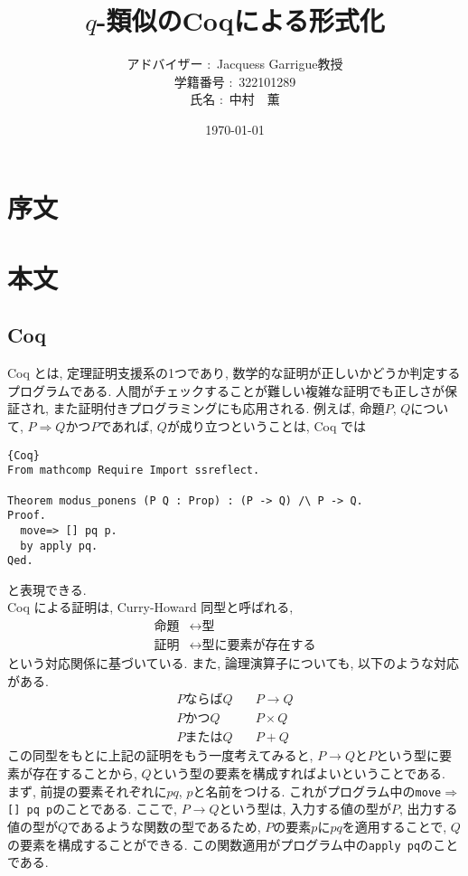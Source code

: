 \documentclass[11pt]{jarticle}
\theoremstyle{mystyle}
\newcommand{\Lra}{\Longrightarrow}
\newcommand{\ra}{\rightarrow}
\newcommand{\0}{\textbf{0}}
\newcommand{\1}{\textbf{1}}
\newcommand{\2}{\textbf{2}}
\begin{document}
\title{$q$-類似のCoqによる形式化}
\author{アドバイザー $\colon$ Jacquess Garrigue教授\\
           学籍番号 $\colon$ 322101289\\
           氏名 $\colon$ 中村　薫}
\date{\today}
\maketitle
\tableofcontents
\section{序文}
\section{本文}
\subsection{Coq}
Coq とは, 定理証明支援系の1つであり, 数学的な証明が正しいかどうか判定するプログラムである. 人間がチェックすることが難しい複雑な証明でも正しさが保証され, また証明付きプログラミングにも応用される. 例えば, 命題$P$, $Q$について, $P \Lra Q$かつ$P$であれば, $Q$が成り立つということは, Coq では
\begin{lstlisting}{Coq}
From mathcomp Require Import ssreflect.

Theorem modus_ponens (P Q : Prop) : (P -> Q) /\ P -> Q.
Proof.
  move=> [] pq p.
  by apply pq.
Qed.
\end{lstlisting}
と表現できる. \\
Coq による証明は, Curry-Howard 同型と呼ばれる, 
\begin{align*}
  \text{命題} &\leftrightarrow \text{型} \\
  \text{証明} &\leftrightarrow \text{型に要素が存在する}
\end{align*}
という対応関係に基づいている. また, 論理演算子についても, 以下のような対応がある. 
\begin{align*}
  P \text{ならば} Q &\quad P \rightarrow Q \\
  P \text{かつ} Q &\quad P \times Q \\
  P \text{または} Q &\quad  P + Q
\end{align*}
この同型をもとに上記の証明をもう一度考えてみると, $P \ra Q$と$P$という型に要素が存在することから, $Q$という型の要素を構成すればよいということである. \\
まず, 前提の要素それぞれに$pq$, $p$と名前をつける. これがプログラム中の{\tt move$\Rightarrow$ [] pq p}のことである. 
ここで, $P \to Q$という型は, 入力する値の型が$P$, 出力する値の型が$Q$であるような関数の型であるため, $P$の要素$p$に$pq$を適用することで, $Q$の要素を構成することができる. この関数適用がプログラム中の{\tt apply pq}のことである. 
\end{document}
